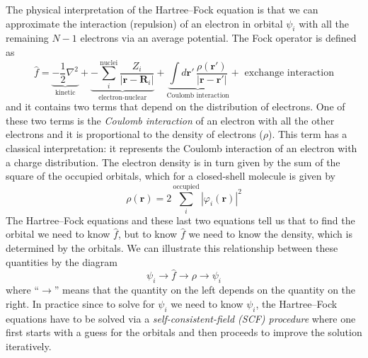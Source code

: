 \documentclass[../Main/notes.tex]{subfiles}
\begin{document}
The physical interpretation of the Hartree--Fock equation is that we can approximate the interaction (repulsion) of an electron in orbital $\psi_i$ with all the remaining $N-1$ electrons via an average potential. 
The Fock operator is defined as
\begin{equation}
\hat{f} = \underbrace{-\frac{1}{2}\nabla^2}_{\text{kinetic}}
+\underbrace{
- \sum_i^{\mathrm{nuclei}} \frac{Z_i}{|\mathbf{r} - \mathbf{R}_i|}
}_{\text{electron-nuclear}}
+
\underbrace{
\int d\mathbf{r}' \, \frac{\rho(\mathbf{r}')}{|\mathbf{r} -\mathbf{r}'|}
}_{\text{Coulomb interaction}} + \text{ exchange interaction}
\end{equation}
and it contains two terms that depend on the distribution of electrons.
One of these two terms is the \emph{Coulomb interaction} of an electron with all the other electrons and it is proportional to the density of electrons ($\rho$). This term has a classical interpretation: it represents the Coulomb interaction of an electron with a charge distribution.
The electron density is in turn given by the sum of the square of the occupied orbitals, which for a closed-shell molecule is given by
\begin{equation}
\rho(\mathbf{r}) = 2 \sum_{i}^\mathrm{occupied} |\varphi_i(\mathbf{r})|^2
\end{equation}
The Hartree--Fock equations and these last two equations tell us that to find the orbital we need to know $\hat{f}$, but to know $\hat{f}$ we need to know the density, which is determined by the orbitals.
We can illustrate this relationship between these quantities by the diagram
\begin{equation}
\psi_i \rightarrow \hat{f} \rightarrow \rho \rightarrow \psi_i
\end{equation}
where ``$\rightarrow$'' means that the quantity on the left depends on the quantity on the right.
In practice since to solve for $\psi_i$ we need to know $\psi_i$, the Hartree--Fock equations have to be solved via a \emph{self-consistent-field (SCF) procedure} where one first starts with a guess for the orbitals and then proceeds to improve the solution iteratively.
\end{document}
